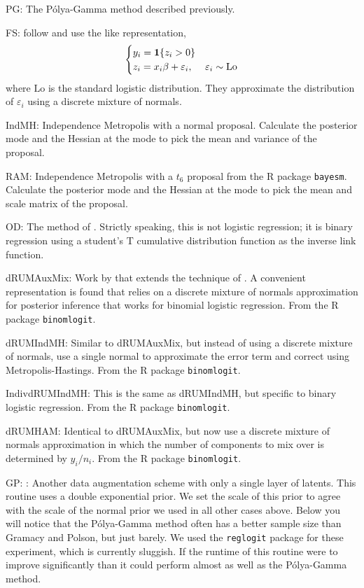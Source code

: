 \documentclass[11pt]{article}
\newcommand{\one}{\bold{1}}
\newcommand{\ep}{\varepsilon}
\newcommand{\Polya}{P\'{o}lya}
\begin{document}
\begin{outline}

\1 PG: The \Polya-Gamma method described previously.

\1 FS: \cite{fruhwirth-schnatter-fruhwirth-2010} follow \cite{holmes-held-2006}
and use the \cite{albert-chib-1993} like representation,
\begin{equation}
\label{eqn:hh-rep}
\begin{cases}
y_i = \one \{ z_i > 0 \} \\
z_i = x_i \beta + \ep_i, & \ep_i \sim \text{Lo}
\end{cases}
\end{equation}
where $\text{Lo}$ is the standard logistic distribution.  They approximate the
distribution of $\ep_i$ using a discrete mixture of normals.

\1 IndMH: Independence Metropolis with a normal proposal.  Calculate the
posterior mode and the Hessian at the mode to pick the mean and variance of the
proposal.

\1 RAM: Independence Metropolis with a $t_6$ proposal from the R package
\texttt{bayesm}.  Calculate the posterior mode and the Hessian at the mode to
pick the mean and scale matrix of the proposal.

\1 OD: The method of \cite{obrien-dunson-2004}.  Strictly speaking, this is not
logistic regression; it is binary regression using a student's T cumulative
distribution function as the inverse link function.

\1 dRUMAuxMix: Work by \cite{fussl-etal-2013} that extends the technique of
\cite{fruhwirth-schnatter-fruhwirth-2010}.  A convenient representation is found
that relies on a discrete mixture of normals approximation for posterior
inference that works for binomial logistic regression.  From the R package
\texttt{binomlogit}.

\1 dRUMIndMH: Similar to dRUMAuxMix, but instead of using a discrete mixture of
normals, use a single normal to approximate the error term and correct using
Metropolis-Hastings.  From the R package \texttt{binomlogit}.

\1 IndivdRUMIndMH: This is the same as dRUMIndMH, but specific to binary
logistic regression.  From the R package \texttt{binomlogit}.

\1 dRUMHAM: Identical to dRUMAuxMix, but now use a discrete mixture of normals
approximation in which the number of components to mix over is determined by
$y_i / n_i$.  From the R package \texttt{binomlogit}.

\1 GP: \cite{gramacy-polson-2012}: Another data augmentation scheme with only a
single layer of latents.  This routine uses a double exponential prior.  We set
the scale of this prior to agree with the scale of the normal prior we used in
all other cases above.  Below you will notice that the \Polya-Gamma method often
has a better sample size than Gramacy and Polson, but just barely.  We used the
\texttt{reglogit} package for these experiment, which is currently sluggish.  If
the runtime of this routine were to improve significantly than it could perform
almost as well as the \Polya-Gamma method.

\end{outline}
\end{document}
